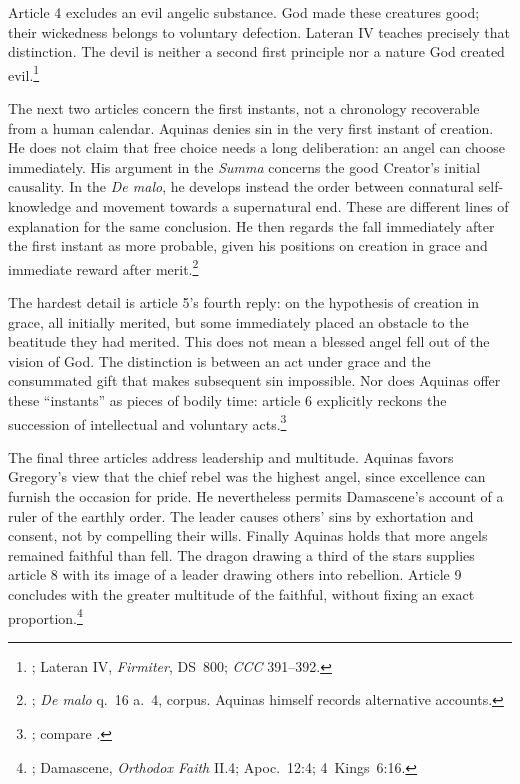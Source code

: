 Article 4 excludes an evil angelic substance. God made these creatures good; their wickedness belongs to voluntary defection. Lateran IV teaches precisely that distinction. The devil is neither a second first principle nor a nature God created evil.\footnote{; Lateran IV, \emph{Firmiter}, DS~800; \emph{CCC} 391--392.}

The next two articles concern the first instants, not a chronology recoverable from a human calendar. Aquinas denies sin in the very first instant of creation. He does not claim that free choice needs a long deliberation: an angel can choose immediately. His argument in the \emph{Summa} concerns the good Creator's initial causality. In the \emph{De malo}, he develops instead the order between connatural self-knowledge and movement towards a supernatural end. These are different lines of explanation for the same conclusion. He then regards the fall immediately after the first instant as more probable, given his positions on creation in grace and immediate reward after merit.\footnote{; \emph{De malo} q.~16 a.~4, corpus. Aquinas himself records alternative accounts.}

The hardest detail is article 5's fourth reply: on the hypothesis of creation in grace, all initially merited, but some immediately placed an obstacle to the beatitude they had merited. This does not mean a blessed angel fell out of the vision of God. The distinction is between an act under grace and the consummated gift that makes subsequent sin impossible. Nor does Aquinas offer these ``instants'' as pieces of bodily time: article 6 explicitly reckons the succession of intellectual and voluntary acts.\footnote{; compare .}

The final three articles address leadership and multitude. Aquinas favors Gregory's view that the chief rebel was the highest angel, since excellence can furnish the occasion for pride. He nevertheless permits Damascene's account of a ruler of the earthly order. The leader causes others' sins by exhortation and consent, not by compelling their wills. Finally Aquinas holds that more angels remained faithful than fell. The dragon drawing a third of the stars supplies article 8 with its image of a leader drawing others into rebellion. Article 9 concludes with the greater multitude of the faithful, without fixing an exact proportion.\footnote{; Damascene, \emph{Orthodox Faith} II.4; Apoc.~12:4; 4~Kings~6:16.}

